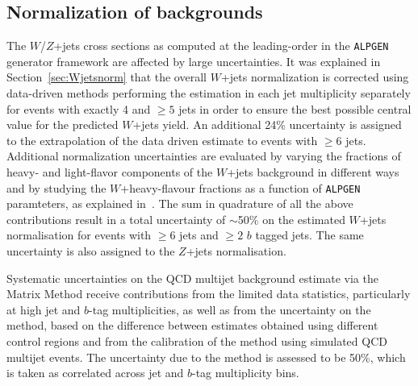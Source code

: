 \subsection{Normalization of backgrounds}\label{sec:syst_normHTX}

The $W$/$Z$+jets cross sections as computed at the
leading-order in the
\texttt{ALPGEN} generator framework
are affected by large uncertainties.
It was explained in Section~\ref{sec:Wjetsnorm}
that the overall $W$+jets normalization is 
corrected using data-driven methods 
performing the estimation in each jet multiplicity
separately for events with exactly 4 and $\geq 5$ 
jets in order to ensure the best possible central value for the 
predicted $W$+jets yield. 
An additional 24\% uncertainty is assigned to the extrapolation of the data driven
estimate to events with $\geq 6$ jets.
Additional normalization uncertainties are evaluated by varying 
the fractions of heavy- and light-flavor components of the $W$+jets background
in different ways and by studying the $W$+heavy-flavour fractions as
a function of \texttt{ALPGEN} paramteters,
as explained in~\cite{topcommon2013}.
The sum in quadrature of all the above contributions result in a 
total uncertainty of $\sim$50\% on
the estimated $W$+jets normalisation for events 
with $\geq 6$ jets and $\geq 2$ $b$ tagged jets. 
The same uncertainty is also assigned to the $Z$+jets normalisation.

Systematic uncertainties on the QCD multijet background 
estimate via the Matrix Method receive
contributions from the limited data statistics, 
particularly at high jet and $b$-tag multiplicities, as
well as from the uncertainty on the method, based on 
the difference between estimates obtained using 
different control regions and from the calibration 
of the method using simulated QCD multijet events.
The uncertainty due to the method is assessed to be 
50\%, which is taken as correlated across jet
and $b$-tag multiplicity bins. 




